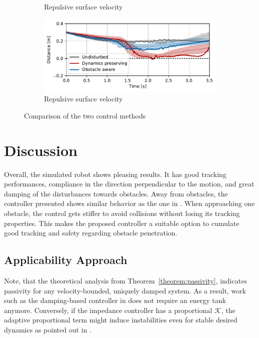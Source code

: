 \begin{figure}
\begin{subfigure}{\columnwidth}
      \caption{Repulsive surface velocity}
      \label{fig:trajectory_comparison_force_magnitude}
    \end{subfigure}
    \begin{subfigure}{\columnwidth}
       \includegraphics[width=\textwidth]{figures/robot_arm_trajectory_distance}
      \caption{Repulsive surface velocity}
      \label{fig:disturbance_with_repulsive_velocity}
    \end{subfigure}
    \caption{Comparison of the two control methods}
    \label{fig:evaluation_on_robot_arm}
\end{figure}

\section{Discussion}
Overall, the simulated robot shows pleasing results. It has good tracking performances, compliance in the direction perpendicular to the motion, and great damping of the disturbances towards obstacles.
Away from obstacles, the controller presented shows similar behavior as the one in \cite{kronander2015passive}. When approaching one obstacle, the control gets stiffer to avoid collisions without losing its tracking properties. This makes the proposed controller a suitable option to cumulate good tracking and safety regarding obstacle penetration.

\subsection{Applicability Approach}
Note, that the theoretical analysis from Theorem~\ref{theorem:passivity}, indicates passivity for any velocity-bounded, uniquely damped system. As a result, work such as the damping-based controller in  \cite{kronander2015passive} does not require an energy tank anymore.
Conversely, if the impedance controller has a proportional $\mathcal{K}$, the adaptive proportional term might induce instabilities even for stable desired dynamics as pointed out in \cite{ferraguti2013tank, kronander2016stability}.
